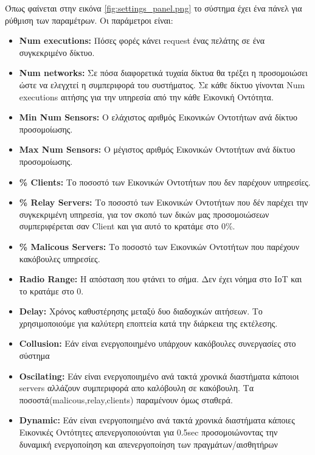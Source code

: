 Όπως φαίνεται στην εικόνα \ref{fig:settings_panel.png} το σύστημα έχει ένα πάνελ για ρύθμιση των παραμέτρων. Οι παράμετροι είναι:
\begin{itemize}
\item \textbf{Num executions:} Πόσες φορές κάνει request ένας πελάτης σε ένα συγκεκριμένο δίκτυο.
\item \textbf{Num networks:} Σε πόσα διαφορετικά τυχαία δίκτυα θα τρέξει η προσομοιώσει ώστε να ελεγχτεί η συμπεριφορά του συστήματος. Σε κάθε δίκτυο γίνονται Num executions αιτήσης για την υπηρεσία από την κάθε Εικονική Οντότητα.
\item \textbf{Min Num Sensors:} O ελάχιστος αριθμός Εικονικών Οντοτήτων ανά δίκτυο προσομοίωσης.
\item \textbf{Μax Num Sensors:} O μέγιστος αριθμός Εικονικών Οντοτήτων ανά δίκτυο προσομοίωσης.

\item \textbf{\% Clients:} Το ποσοστό των Εικονικών Οντοτήτων που δεν παρέχουν  υπηρεσίες.

\item \textbf{\% Relay Servers:} Το ποσοστό των Εικονικών Οντοτήτων που δέν παρέχει την συγκεκριμένη υπηρεσία, για τον σκοπό των δικών μας προσομοιώσεων συμπεριφέρεται σαν Client και για αυτό το κρατάμε στο 0\%.

\item \textbf{\% Malicous Servers:} Το ποσοστό των Εικονικών Οντοτήτων που παρέχουν κακόβουλες υπηρεσίες.

\item \textbf{Radio Range:} Η απόσταση που φτάνει το σήμα. Δεν έχει νόημα στο ΙοΤ και το κρατάμε στο 0.

\item \textbf{Delay:} Χρόνος καθυστέρησης μεταξύ δυο διαδοχικών αιτήσεων. Το χρησιμοποιούμε για καλύτερη εποπτεία κατά την διάρκεια της εκτέλεσης.

\item \textbf{Collusion:} Εάν είναι ενεργοποιημένο υπάρχουν κακόβουλες συνεργασίες στο σύστημα

\item \textbf{Oscilating:} Εάν είναι ενεργοποιημένο ανά τακτά χρονικά διαστήματα κάποιοι servers αλλάζουν συμπεριφορά απο καλόβουλη σε κακόβουλη. Τα ποσοστά(malicous,relay,clients) παραμένουν όμως σταθερά.

\item \textbf{Dynamic:} Εάν είναι ενεργοποιημένο ανά τακτά χρονικά διαστήματα κάποιες Εικονικές Οντότητες απενεργοποιούνται για 0.5sec προσομοιώνοντας την δυναμική ενεργοποίηση και απενεργοποίηση των πραγμάτων/αισθητήρων
\end{itemize}
\newpage
{}


